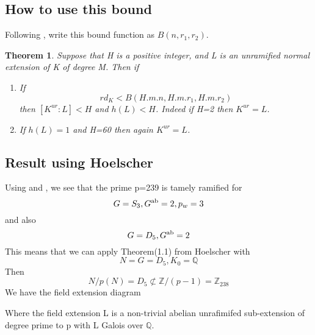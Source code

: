 \documentclass[preprint,12pt,leqno]{elsarticle}
\newtheorem{theorem}{Theorem}
\begin{document}
\subsection{How to use this bound}
Following \cite{YAMA}, write this bound function as $B(n,r_1,r_2)$.
\begin{theorem}
Suppose that H is a positive integer, and L is an unramified normal extension of K of degree M. Then if
\begin{enumerate}
    \item If \begin{equation}
        rd_K<B(H.m.n,H.m.r_1,H.m.r_2)
    \end{equation}
    then $[K^{ur}:L]<H$ and $h(L)<H$. Indeed if H=2 then $K^{ur}=L$.

    \item If
        $h(L)=1$ and H=60 then again $K^{ur}=L$.
\end{enumerate}
\end{theorem}
\subsection{Result using Hoelscher}

Using \cite{HOEL} and \cite{JONE}, we see that 
the prime p=239 is tamely ramified for 
\begin{equation}
  G=S_3,G\textsuperscript{ab} = 2, p_w =3  
\end{equation} and also 
\begin{equation}
    G=D_5,G\textsuperscript{ab} = 2 
\end{equation}
This means that we can apply Theorem(1.1) from Hoelscher with
\begin{equation}
    N = G = D_5, K_0 = \mathbb{Q}
\end{equation}
Then 
\begin{equation}
N/p(N) = D_5 \not\subset \mathbb{Z}/(p-1) = \mathbb{Z}_{238}
\end{equation}
\newline
We have the field extension diagram
\bigskip
\newline
\begin{center}
    
\end{center}
\newline
Where the field extension L is a non-trivial abelian unrafimifed sub-extension of degree prime to p with L Galois over $\mathbb{Q}$.
\end{document}
